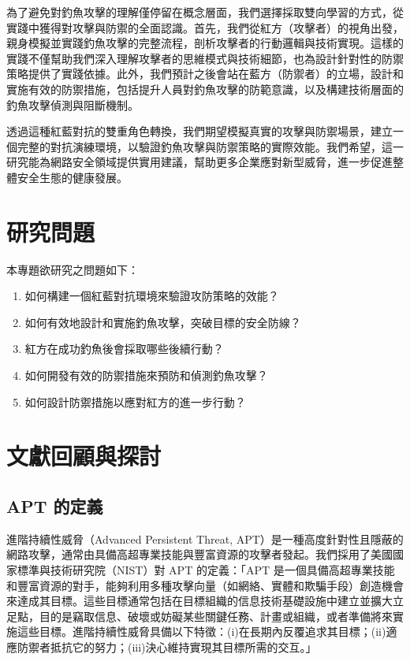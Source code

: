 \documentclass[a4paper,12pt]{article}
\begin{document}
為了避免對釣魚攻擊的理解僅停留在概念層面，我們選擇採取雙向學習的方式，從實踐中獲得對攻擊與防禦的全面認識。首先，我們從紅方（攻擊者）的視角出發，親身模擬並實踐釣魚攻擊的完整流程，剖析攻擊者的行動邏輯與技術實現。這樣的實踐不僅幫助我們深入理解攻擊者的思維模式與技術細節，也為設計針對性的防禦策略提供了實踐依據。此外，我們預計之後會站在藍方（防禦者）的立場，設計和實施有效的防禦措施，包括提升人員對釣魚攻擊的防範意識，以及構建技術層面的釣魚攻擊偵測與阻斷機制。

透過這種紅藍對抗的雙重角色轉換，我們期望模擬真實的攻擊與防禦場景，建立一個完整的對抗演練環境，以驗證釣魚攻擊與防禦策略的實際效能。我們希望，這一研究能為網路安全領域提供實用建議，幫助更多企業應對新型威脅，進一步促進整體安全生態的健康發展。

\section{研究問題}
本專題欲研究之問題如下：
\begin{enumerate}
  \item 如何構建一個紅藍對抗環境來驗證攻防策略的效能？
  \item 如何有效地設計和實施釣魚攻擊，突破目標的安全防線？
  \item 紅方在成功釣魚後會採取哪些後續行動？
  \item 如何開發有效的防禦措施來預防和偵測釣魚攻擊？
  \item 如何設計防禦措施以應對紅方的進一步行動？
\end{enumerate}

\section{文獻回顧與探討}

\subsection{APT 的定義}

進階持續性威脅（Advanced Persistent Threat, APT）是一種高度針對性且隱蔽的網路攻擊，通常由具備高超專業技能與豐富資源的攻擊者發起。我們採用了美國國家標準與技術研究院（NIST）對 APT 的定義：「APT 是一個具備高超專業技能和豐富資源的對手，能夠利用多種攻擊向量（如網絡、實體和欺騙手段）創造機會來達成其目標。這些目標通常包括在目標組織的信息技術基礎設施中建立並擴大立足點，目的是竊取信息、破壞或妨礙某些關鍵任務、計畫或組織，或者準備將來實施這些目標。進階持續性威脅具備以下特徵：(i)在長期內反覆追求其目標；(ii)適應防禦者抵抗它的努力；(iii)決心維持實現其目標所需的交互。」
\end{document}

